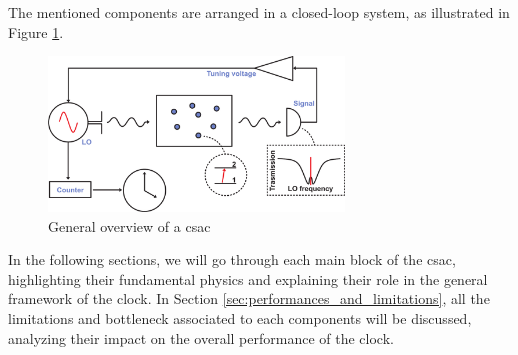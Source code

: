 The mentioned components are arranged in a closed-loop system, as illustrated in Figure \ref{fig:CSAC-general-overview}.

\begin{figure}[H]
    \centering
    \includegraphics[width=0.7\textwidth, max width=\linewidth]{pdf/CSAC-scheme.pdf}
    \caption{General overview of a \acrshort{csac}}
    \label{fig:CSAC-general-overview}
\end{figure}

In the following sections, we will go through each main block of the \acrshort{csac}, highlighting their fundamental physics and explaining their role in the general framework of the clock.
In Section \ref{sec:performances_and_limitations}, all the limitations and bottleneck associated to each components will be discussed, analyzing their impact on the overall performance of the clock.
